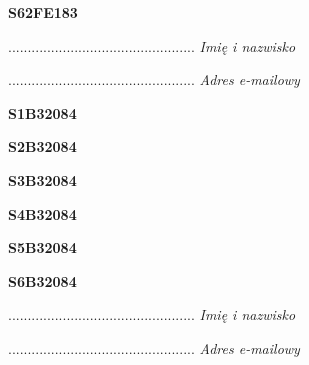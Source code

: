 \begin{turn}{90}\huge \textbf{S62FE183}\end{turn}

\begin{turn}{90}\begin{minipage}{\linewidth} \vspace{20mm} ................................................  \textit{Imię i nazwisko}\end{minipage}\end{turn}

\begin{turn}{90}\begin{minipage}{\linewidth} \vspace{20mm} ................................................  \textit{Adres e-mailowy}\end{minipage}\end{turn}

\begin{turn}{90}\huge \textbf{S1B32084}\end{turn}

\begin{turn}{90}\huge \textbf{S2B32084}\end{turn}

\begin{turn}{90}\huge \textbf{S3B32084}\end{turn}

\begin{turn}{90}\huge \textbf{S4B32084}\end{turn}

\begin{turn}{90}\huge \textbf{S5B32084}\end{turn}

\begin{turn}{90}\huge \textbf{S6B32084}\end{turn}

\begin{turn}{90}\begin{minipage}{\linewidth} \vspace{20mm} ................................................  \textit{Imię i nazwisko}\end{minipage}\end{turn}

\begin{turn}{90}\begin{minipage}{\linewidth} \vspace{20mm} ................................................  \textit{Adres e-mailowy}\end{minipage}\end{turn}

